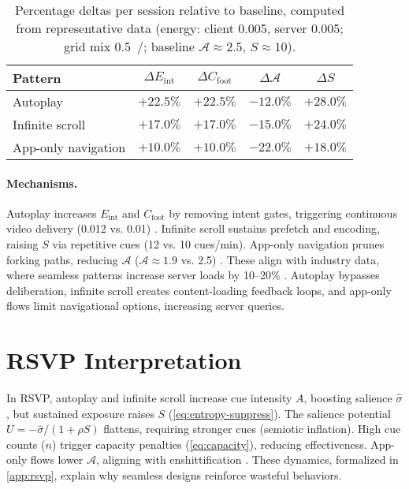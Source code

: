 \documentclass[openany]{book}
\newcommand{\Sent}{S} %
\newcommand{\Eint}{E_{\mathrm{int}}} %
\newcommand{\Cfoot}{C_{\mathrm{foot}}} %
\newcommand{\Auton}{\mathcal{A}} %
\newcommand{\kWh}{\mathrm{kWh}}
\begin{document}
\begin{table}[h]
\centering
\begin{tabular}{lcccc}
\hline
\textbf{Pattern} & $\Delta \Eint$ & $\Delta \Cfoot$ & $\Delta \Auton$ & $\Delta \Sent$ \\
\hline
Autoplay & $+22.5\%$ & $+22.5\%$ & $-12.0\%$ & $+28.0\%$ \\
Infinite scroll & $+17.0\%$ & $+17.0\%$ & $-15.0\%$ & $+24.0\%$ \\
App-only navigation & $+10.0\%$ & $+10.0\%$ & $-22.0\%$ & $+18.0\%$ \\
\hline
\end{tabular}
\caption{Percentage deltas per session relative to baseline, computed from representative data (energy: client \SI{0.005}{\kWh}, server \SI{0.005}{\kWh}; grid mix \SI{0.5}{\kgCOe/\kWh}; baseline $\Auton \approx 2.5$, $\Sent \approx 10$).}
\label{tab:deltas}
\end{table}

\paragraph{Mechanisms.}
Autoplay increases \(\Eint\) and \(\Cfoot\) by removing intent gates, triggering continuous video delivery (\SI{0.012}{\kWh} vs. \SI{0.01}{\kWh}) \citep{extentia2024}. Infinite scroll sustains prefetch and encoding, raising \(\Sent\) via repetitive cues (12 vs. 10 cues/min). App-only navigation prunes forking paths, reducing \(\Auton\) (\(\Auton \approx 1.9\) vs. 2.5) \citep{doctorow2022}. These align with industry data, where seamless patterns increase server loads by 10--20\% \citep{colak2024}. Autoplay bypasses deliberation, infinite scroll creates content-loading feedback loops, and app-only flows limit navigational options, increasing server queries.

\section{RSVP Interpretation}
\label{sec:hidden-rsvp}
In RSVP, autoplay and infinite scroll increase cue intensity \(A\), boosting salience \(\widehat{\sigma}\), but sustained exposure raises \(\Sent\) (\cref{eq:entropy-suppress}). The salience potential \(U = -\widehat{\sigma}/(1+\rho \Sent)\) flattens, requiring stronger cues (semiotic inflation). High cue counts (\(n\)) trigger capacity penalties (\cref{eq:capacity}), reducing effectiveness. App-only flows lower \(\Auton\), aligning with enshittification \citep{doctorow2022}. These dynamics, formalized in \cref{app:rsvp}, explain why seamless designs reinforce wasteful behaviors.
\end{document}

